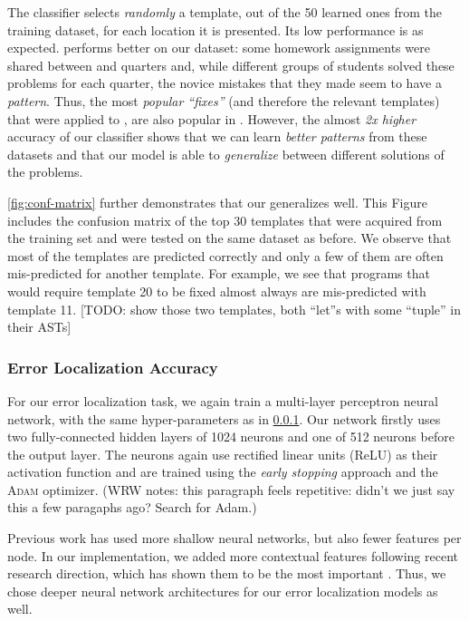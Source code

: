 The \random classifier selects \emph{randomly} a template, out of the 50 learned
ones from the \SPRING training dataset, for each location it is presented. Its
low performance is as expected. 
\popular performs better on our dataset: 
some homework assignments were
shared between \SPRING and \FALL quarters and, while different groups of
students solved these problems for each quarter, the novice mistakes that they
made seem to have a \emph{pattern}. Thus, the most \emph{popular ``fixes''} (and
therefore the relevant templates) that were applied to \SPRING, are also popular
in \FALL. However, the almost \emph{2x higher} accuracy of our \dnn classifier
shows that we can learn \emph{better patterns} from these datasets and that our
\dnn model is able to \emph{generalize} between different solutions of the
problems.

\autoref{fig:conf-matrix} further demonstrates that our \dnn generalizes well. This
Figure includes the confusion matrix of the top 30 templates that were acquired
from the training set and were tested on the same \FALL dataset as before. We
observe that most of the templates are predicted correctly and only a few of
them are often mis-predicted for another template. For example, we see that
programs that would require template 20 to be fixed almost always are
mis-predicted with template 11. [TODO: show those two templates, both ``let''s
with some ``tuple'' in their ASTs]

\subsubsection{Error Localization Accuracy}
\label{subsubsec:error_loc_acc}

For our error localization task, we again train a multi-layer perceptron neural
network, with the same hyper-parameters as in \ref{subsubsec:error_loc_acc}. Our
network firstly uses two fully-connected hidden layers of 1024 neurons and one
of 512 neurons before the output layer. The neurons again use rectified linear
units (ReLU) as their activation function and are trained using the \emph{early
stopping} approach and the \textsc{Adam} optimizer.
(WRW notes: this paragraph feels repetitive: didn't we just say this a few
paragaphs ago? Search for Adam.) 

Previous work \citep[][]{Seidel:2017} has used more shallow neural networks, but
also fewer features per node. In our implementation, we added more contextual
features following recent research direction, which has shown them to be the
most important \citep[TODO: add the lstm paper][]{Seidel:2017}. Thus, we
chose deeper neural network architectures for our error localization models as
well.

